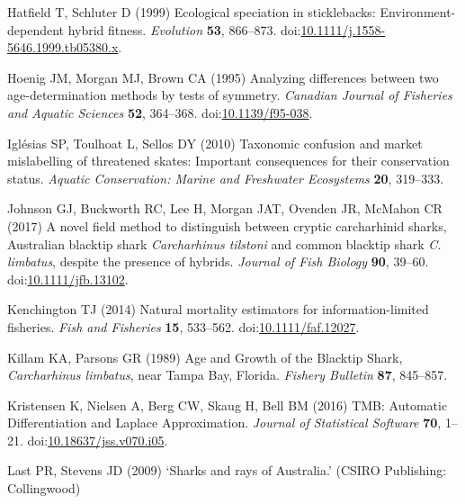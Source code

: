 \documentclass[]{article}
\begin{document}
\leavevmode\hypertarget{ref-hatfield_ecological_1999}{}%
Hatfield T, Schluter D (1999) Ecological speciation in sticklebacks:
Environment-dependent hybrid fitness. \emph{Evolution} \textbf{53},
866--873.
doi:\href{https://doi.org/10.1111/j.1558-5646.1999.tb05380.x}{10.1111/j.1558-5646.1999.tb05380.x}.

\leavevmode\hypertarget{ref-hoenig_analyzing_1995}{}%
Hoenig JM, Morgan MJ, Brown CA (1995) Analyzing differences between two
age-determination methods by tests of symmetry. \emph{Canadian Journal
of Fisheries and Aquatic Sciences} \textbf{52}, 364--368.
doi:\href{https://doi.org/10.1139/f95-038}{10.1139/f95-038}.

\leavevmode\hypertarget{ref-iglesias_taxonomic_2010}{}%
Iglésias SP, Toulhoat L, Sellos DY (2010) Taxonomic confusion and market
mislabelling of threatened skates: Important consequences for their
conservation status. \emph{Aquatic Conservation: Marine and Freshwater
Ecosystems} \textbf{20}, 319--333.

\leavevmode\hypertarget{ref-johnson_novel_2017}{}%
Johnson GJ, Buckworth RC, Lee H, Morgan JAT, Ovenden JR, McMahon CR
(2017) A novel field method to distinguish between cryptic carcharhinid
sharks, Australian blacktip shark \emph{Carcharhinus tilstoni} and
common blacktip shark \emph{C. limbatus}, despite the presence of
hybrids. \emph{Journal of Fish Biology} \textbf{90}, 39--60.
doi:\href{https://doi.org/10.1111/jfb.13102}{10.1111/jfb.13102}.

\leavevmode\hypertarget{ref-kenchington_natural_2014}{}%
Kenchington TJ (2014) Natural mortality estimators for
information-limited fisheries. \emph{Fish and Fisheries} \textbf{15},
533--562.
doi:\href{https://doi.org/10.1111/faf.12027}{10.1111/faf.12027}.

\leavevmode\hypertarget{ref-killam_age_1989}{}%
Killam KA, Parsons GR (1989) Age and Growth of the Blacktip Shark,
\emph{Carcharhinus limbatus}, near Tampa Bay, Florida. \emph{Fishery
Bulletin} \textbf{87}, 845--857.

\leavevmode\hypertarget{ref-kristensen_tmb:_2016}{}%
Kristensen K, Nielsen A, Berg CW, Skaug H, Bell BM (2016) TMB: Automatic
Differentiation and Laplace Approximation. \emph{Journal of Statistical
Software} \textbf{70}, 1--21.
doi:\href{https://doi.org/10.18637/jss.v070.i05}{10.18637/jss.v070.i05}.

\leavevmode\hypertarget{ref-last_sharks_2009}{}%
Last PR, Stevens JD (2009) `Sharks and rays of Australia.' (CSIRO
Publishing: Collingwood)
\end{document}
